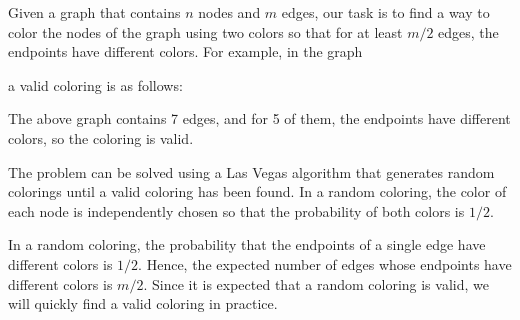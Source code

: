 Given a graph that contains $n$ nodes and $m$ edges,
our task is to find a way to color the nodes
of the graph using two colors so that
for at least $m/2$ edges, the endpoints
have different colors.
For example, in the graph
\begin{center}
\end{center}
a valid coloring is as follows:
\begin{center}
\end{center}
The above graph contains 7 edges, and for 5 of them,
the endpoints have different colors,
so the coloring is valid.

The problem can be solved using a Las Vegas algorithm
that generates random colorings until a valid coloring
has been found.
In a random coloring, the color of each node is
independently chosen so that the probability of
both colors is $1/2$.

In a random coloring, the probability that the endpoints
of a single edge have different colors is $1/2$.
Hence, the expected number of edges whose endpoints
have different colors is $m/2$.
Since it is expected that a random coloring is valid,
we will quickly find a valid coloring in practice.
